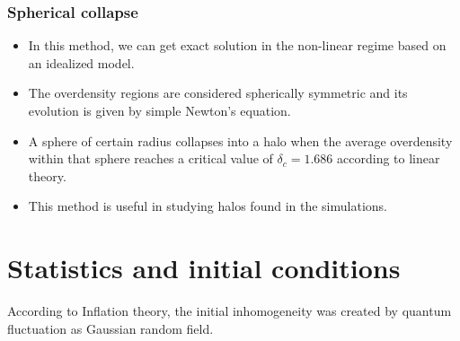 \documentclass[12pt]{article}
\begin{document}
\subsubsection{Spherical collapse}
\begin{itemize}
\item In this method, we can get exact solution in the non-linear regime based on an idealized model. 
\item The overdensity regions are considered spherically symmetric and its evolution is given by simple Newton's equation.
\item A sphere of certain radius collapses into a halo when the average overdensity within that sphere reaches a critical value of $\delta_c = 1.686$ according to linear theory.
\item This method is useful in studying halos found in the simulations.
\end{itemize}
 










\section{Statistics and initial conditions}
According to Inflation theory, the initial inhomogeneity was created by quantum fluctuation as Gaussian random field.
\end{document}
